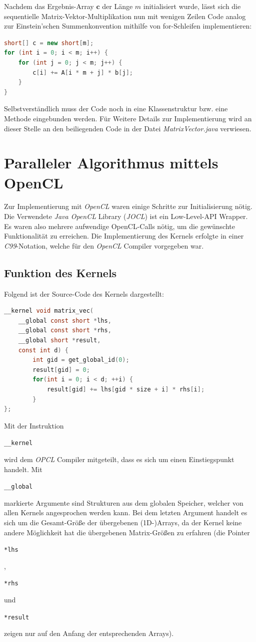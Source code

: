\documentclass[
	ngerman,
	ruledheaders=section,
	class=report,
	thesis={type=Dokumentation},
	ignore-missing-data=true,
	accentcolor=9c,
	custommargins=false,
	marginpar=false,
	parskip=half-,
	fontsize=11pt,
]{tudapub}
\let\code\texttt
\def\code#1{\begin{small}\texttt{#1}\end{small}}
\begin{document}
Nachdem das Ergebnis-Array $\mathbf{c}$ der Länge $m$ initialisiert wurde, lässt sich die sequentielle Matrix-Vektor-Multiplikation nun mit wenigen Zeilen Code analog zur Einstein'schen Summenkonvention mithilfe von for-Schleifen implementieren:
\begin{lstlisting}[language=java]
short[] c = new short[m];
for (int i = 0; i < m; i++) {
	for (int j = 0; j < m; j++) {
		c[i] += A[i * m + j] * b[j];
	}
}
\end{lstlisting}
Selbstverständlich muss der Code noch in eine Klassenstruktur bzw. eine Methode eingebunden werden. Für Weitere Details zur Implementierung wird an dieser Stelle an den beiliegenden Code in der Datei \textit{MatrixVector.java} verwiesen.

\chapter{Paralleler Algorithmus mittels OpenCL}

Zur Implementierung mit \textit{OpenCL }waren einige Schritte zur Initialisierung nötig. Die Verwendete \textit{Java OpenCL} Library (\textit{JOCL}) ist ein Low-Level-API Wrapper. Es waren also mehrere aufwendige OpenCL-Calls nötig, um die gewünschte Funktionalität zu erreichen. Die Implementierung des Kernels erfolgte in einer \textit{C99}-Notation, welche für den \textit{OpenCL} Compiler vorgegeben war.

\section{Funktion des Kernels}
Folgend ist der Source-Code des Kernels dargestellt:
\begin{lstlisting}[language=c,label=kernel_source]
__kernel void matrix_vec(
	__global const short *lhs, 
	__global const short *rhs, 
	__global short *result, 
	const int d) {
		int gid = get_global_id(0);
		result[gid] = 0;		
		for(int i = 0; i < d; ++i) {
			result[gid] += lhs[gid * size + i] * rhs[i];
		}
};
\end{lstlisting}
Mit der Instruktion \code{\_\_kernel} wird dem \textit{OPCL} Compiler mitgeteilt, dass es sich um einen Einstiegspunkt handelt. Mit \code{\_\_global} markierte Argumente sind Strukturen aus dem globalen Speicher, welcher von allen Kernels angesprochen werden kann. Bei dem letzten Argument handelt es sich um die Gesamt-Größe der übergebenen (1D-)Arrays, da der Kernel keine andere Möglichkeit hat die übergebenen Matrix-Größen zu erfahren (die Pointer \code{*lhs}, \code{*rhs} und \code{*result} zeigen nur auf den Anfang der entsprechenden Arrays).
\end{document}
